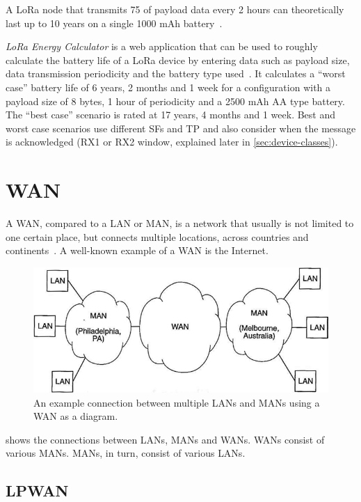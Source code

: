 A \ac{LoRa} node that transmits \SI{75}{\byte} of payload data every 2 hours can theoretically last up to 10 years on a single 1000 mAh battery~\cite{cheong_comparison_2017}.

\emph{LoRa Energy Calculator} is a web application that can be used to roughly calculate the battery life of a \ac{LoRa} device by entering data such as payload size, data transmission periodicity and the battery type used~\cite{dramco_research_group_lora_2023}.
It calculates a ``worst case'' battery life of 6 years, 2 months and 1 week for a configuration with a payload size of 8 bytes, 1 hour of periodicity and a 2500 mAh AA type battery.
The ``best case'' scenario is rated at 17 years, 4 months and 1 week.
Best and worst case scenarios use different \aclp{SF} and \ac{TP} and also consider when the message is acknowledged (RX1 or RX2 window, explained later in \cref{sec:device-classes}).

\section{\acf{WAN}}

A \ac{WAN}, compared to a \acf{LAN} or \acf{MAN}, is a network that usually is not limited to one certain place, but connects multiple locations, across countries and continents~\cite[p. 2]{sadiku_fundamentals_2022}.
A well-known example of a \ac{WAN} is the Internet.

\begin{figure}[htbp]
    \centering
    \includegraphics[width=.6\textwidth]{pictures/lorawan-structure/wan_diagram.png}
    \caption{
        An example connection between multiple \acfp{LAN} and \acfp{MAN} using a \acf{WAN} as a diagram.\protect\cite{sadiku_fundamentals_2022}
    }\label{pic:wan-diagram}
\end{figure}

 shows the connections between \acfp{LAN}, \acfp{MAN} and \acfp{WAN}.
\acp{WAN} consist of various \acp{MAN}.
\acp{MAN}, in turn, consist of various \acp{LAN}.

\subsection{\acf{LPWAN}}

